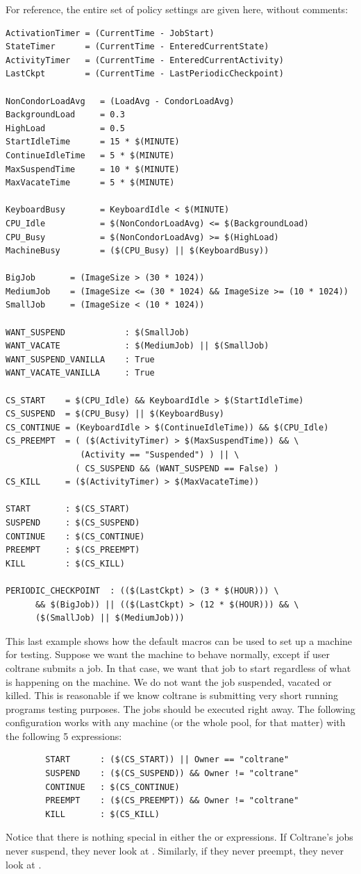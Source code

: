 For reference, the entire set of policy settings are
given here, without comments:
\begin{verbatim}
ActivationTimer = (CurrentTime - JobStart)
StateTimer      = (CurrentTime - EnteredCurrentState)
ActivityTimer   = (CurrentTime - EnteredCurrentActivity)
LastCkpt        = (CurrentTime - LastPeriodicCheckpoint)

NonCondorLoadAvg   = (LoadAvg - CondorLoadAvg)
BackgroundLoad     = 0.3
HighLoad           = 0.5
StartIdleTime      = 15 * $(MINUTE)
ContinueIdleTime   = 5 * $(MINUTE)
MaxSuspendTime     = 10 * $(MINUTE)
MaxVacateTime      = 5 * $(MINUTE)

KeyboardBusy       = KeyboardIdle < $(MINUTE)
CPU_Idle           = $(NonCondorLoadAvg) <= $(BackgroundLoad)
CPU_Busy           = $(NonCondorLoadAvg) >= $(HighLoad)
MachineBusy        = ($(CPU_Busy) || $(KeyboardBusy))

BigJob       = (ImageSize > (30 * 1024))
MediumJob    = (ImageSize <= (30 * 1024) && ImageSize >= (10 * 1024))
SmallJob     = (ImageSize < (10 * 1024))

WANT_SUSPEND            : $(SmallJob)
WANT_VACATE             : $(MediumJob) || $(SmallJob)
WANT_SUSPEND_VANILLA    : True
WANT_VACATE_VANILLA     : True

CS_START    = $(CPU_Idle) && KeyboardIdle > $(StartIdleTime)
CS_SUSPEND  = $(CPU_Busy) || $(KeyboardBusy)
CS_CONTINUE = (KeyboardIdle > $(ContinueIdleTime)) && $(CPU_Idle)
CS_PREEMPT  = ( ($(ActivityTimer) > $(MaxSuspendTime)) && \
               (Activity == "Suspended") ) || \
              ( CS_SUSPEND && (WANT_SUSPEND == False) )
CS_KILL     = ($(ActivityTimer) > $(MaxVacateTime))

START       : $(CS_START)
SUSPEND     : $(CS_SUSPEND)
CONTINUE    : $(CS_CONTINUE)
PREEMPT     : $(CS_PREEMPT)
KILL        : $(CS_KILL)

PERIODIC_CHECKPOINT  : (($(LastCkpt) > (3 * $(HOUR))) \
      && $(BigJob)) || (($(LastCkpt) > (12 * $(HOUR))) && \
      ($(SmallJob) || $(MediumJob)))
\end{verbatim}

This last example shows how the default macros can be used to
set up a machine for testing.
Suppose we want the machine to
behave normally, except if user coltrane submits a job.
In that case, we
want that job to start regardless of what is happening on the machine.
We do not want the job suspended, vacated or killed.
This is reasonable if 
we know coltrane is submitting very short
running programs testing purposes. 
The jobs should be executed right away.
The following configuration works with any machine
(or the whole pool, for that matter) with the following 5 expressions:
\begin{verbatim}
        START      : ($(CS_START)) || Owner == "coltrane"
        SUSPEND    : ($(CS_SUSPEND)) && Owner != "coltrane"
        CONTINUE   : $(CS_CONTINUE)
        PREEMPT    : ($(CS_PREEMPT)) && Owner != "coltrane"
        KILL       : $(CS_KILL)
\end{verbatim}
Notice that there is nothing special in either the
\Expr{CONTINUE} or \Expr{KILL} expressions.
If Coltrane's jobs never suspend, they never look at .  
Similarly, if they never preempt, they never look at . 

